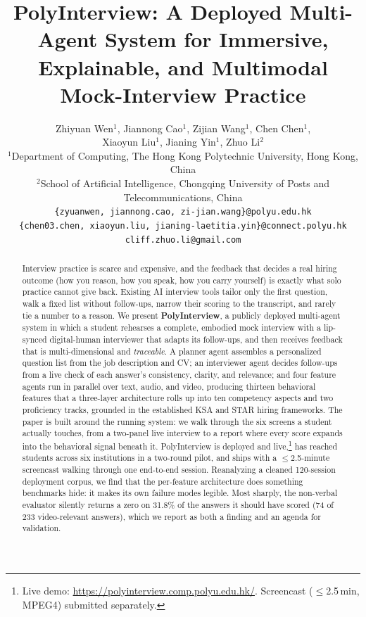 \documentclass[11pt]{article}
\title{PolyInterview: A Deployed Multi-Agent System for Immersive,\\ Explainable, and Multimodal Mock-Interview Practice}
\author{
  \normalfont Zhiyuan Wen$^{1}$, Jiannong Cao$^{1}$, Zijian Wang$^{1}$, Chen Chen$^{1}$, \\
  \normalfont Xiaoyun Liu$^{1}$, Jianing Yin$^{1}$, Zhuo Li$^{2}$ \\[3pt]
  \normalfont $^{1}$Department of Computing, The Hong Kong Polytechnic University, Hong Kong, China \\
  \normalfont $^{2}$School of Artificial Intelligence, Chongqing University of Posts and Telecommunications, China \\[3pt]
  \normalfont\texttt{\{zyuanwen, jiannong.cao, zi-jian.wang\}@polyu.edu.hk} \\
  \normalfont\texttt{\{chen03.chen, xiaoyun.liu, jianing-laetitia.yin\}@connect.polyu.hk} \\
  \normalfont\texttt{cliff.zhuo.li@gmail.com}
}
\begin{document}
\maketitle

\begin{abstract}
Interview practice is scarce and expensive, and the feedback that decides a real hiring outcome (how you reason, how you speak, how you carry yourself) is exactly what solo practice cannot give back. Existing AI interview tools tailor only the first question, walk a fixed list without follow-ups, narrow their scoring to the transcript, and rarely tie a number to a reason. We present \textbf{PolyInterview}, a publicly deployed multi-agent system in which a student rehearses a complete, embodied mock interview with a lip-synced digital-human interviewer that adapts its follow-ups, and then receives feedback that is multi-dimensional and \emph{traceable}. A planner agent assembles a personalized question list from the job description and CV; an interviewer agent decides follow-ups from a live check of each answer's consistency, clarity, and relevance; and four feature agents run in parallel over text, audio, and video, producing thirteen behavioral features that a three-layer architecture rolls up into ten competency aspects and two proficiency tracks, grounded in the established KSA and STAR hiring frameworks. The paper is built around the running system: we walk through the six screens a student actually touches, from a two-panel live interview to a report where every score expands into the behavioral signal beneath it. PolyInterview is deployed and live,\footnote{Live demo: \url{https://polyinterview.comp.polyu.edu.hk/}. Screencast ($\leq$2.5\,min, MPEG4) submitted separately.} has reached students across six institutions in a two-round pilot, and ships with a $\leq$2.5-minute screencast walking through one end-to-end session. Reanalyzing a cleaned 120-session deployment corpus, we find that the per-feature architecture does something benchmarks hide: it makes its own failure modes legible. Most sharply, the non-verbal evaluator silently returns a zero on 31.8\% of the answers it should have scored (74 of 233 video-relevant answers), which we report as both a finding and an agenda for validation.
\end{abstract}
\end{document}

